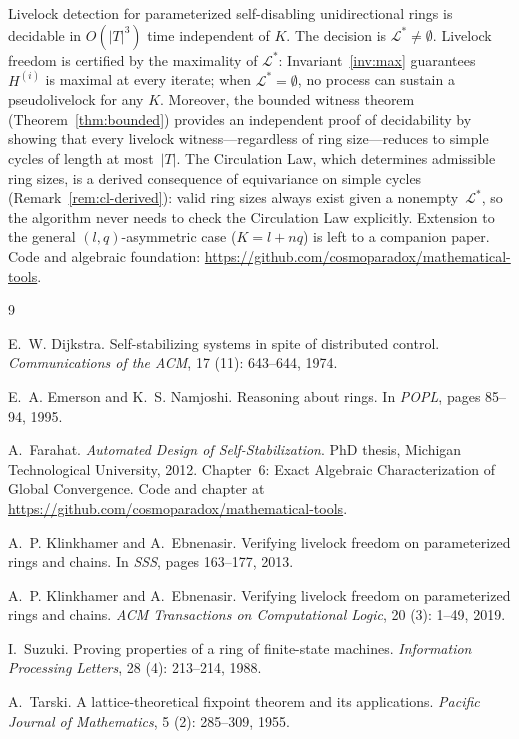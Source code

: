 \documentclass{article}
\newcommand{\Ls}{\mathcal{L}^{*}}
\newcommand{\Hi}[1]{H^{(#1)}}             %
\begin{document}
Livelock detection for parameterized self-disabling unidirectional rings
is decidable in $O(|T|^3)$ time independent of $K$. The decision is
$\Ls\neq\emptyset$. Livelock freedom is certified by the maximality of
$\Ls$: Invariant~\ref{inv:max} guarantees $\Hi{i}$ is maximal at every
iterate; when $\Ls=\emptyset$, no process can sustain a pseudolivelock
for any $K$.
Moreover, the bounded witness theorem (Theorem~\ref{thm:bounded})
provides an independent proof of decidability by showing that every
livelock witness---regardless of ring size---reduces to simple cycles
of length at most~$|T|$.
The Circulation Law, which determines admissible ring sizes, is a
derived consequence of equivariance on simple cycles
(Remark~\ref{rem:cl-derived}): valid ring sizes always exist given
a nonempty~$\Ls$, so the algorithm never needs to check the
Circulation Law explicitly.
Extension to the general $(l,q)$-asymmetric case ($K=l+nq$) is left to
a companion paper. Code and algebraic foundation:
\url{https://github.com/cosmoparadox/mathematical-tools}.


\begin{thebibliography}{9}

E.~W. Dijkstra.
\newblock Self-stabilizing systems in spite of distributed control.
\newblock \emph{Communications of the ACM}, 17 (11):
  643--644, 1974.

E.~A. Emerson and K.~S. Namjoshi.
\newblock Reasoning about rings.
\newblock In \emph{POPL}, pages 85--94, 1995.

A.~Farahat.
\newblock \emph{Automated Design of Self-Stabilization}.
\newblock PhD thesis, Michigan Technological University, 2012.
\newblock Chapter~6: Exact Algebraic Characterization of Global Convergence.
  Code and chapter at
  \url{https://github.com/cosmoparadox/mathematical-tools}.

A.~P. Klinkhamer and A.~Ebnenasir.
\newblock Verifying livelock freedom on parameterized rings and chains.
\newblock In \emph{SSS}, pages 163--177, 2013.

A.~P. Klinkhamer and A.~Ebnenasir.
\newblock Verifying livelock freedom on parameterized rings and chains.
\newblock \emph{ACM Transactions on Computational Logic}, 20
  (3): 1--49, 2019.

I.~Suzuki.
\newblock Proving properties of a ring of finite-state machines.
\newblock \emph{Information Processing Letters}, 28 (4):
  213--214, 1988.

A.~Tarski.
\newblock A lattice-theoretical fixpoint theorem and its applications.
\newblock \emph{Pacific Journal of Mathematics}, 5 (2):
  285--309, 1955.

\end{thebibliography}
\end{document}
